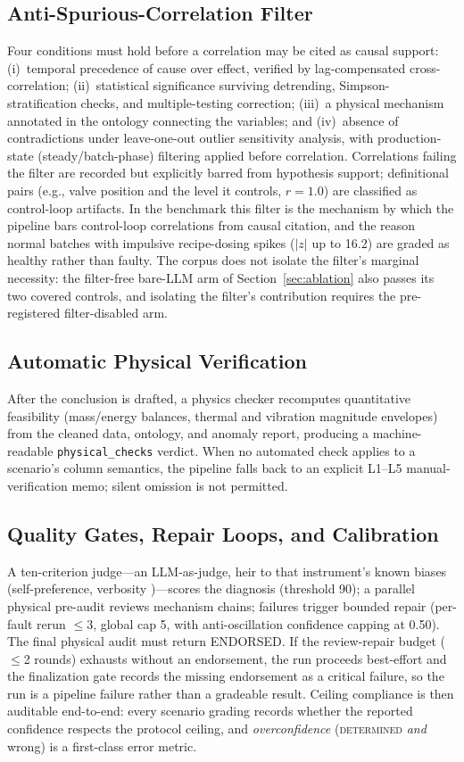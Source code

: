 \documentclass[preprint,12pt]{elsarticle}
\begin{document}
\subsection{Anti-Spurious-Correlation Filter}
Four conditions must hold before a correlation may be cited as causal support: (i)~temporal precedence of cause over effect, verified by lag-compensated cross-correlation; (ii)~statistical significance surviving detrending, Simpson-stratification checks, and multiple-testing correction; (iii)~a physical mechanism annotated in the ontology connecting the variables; and (iv)~absence of contradictions under leave-one-out outlier sensitivity analysis, with production-state (steady/batch-phase) filtering applied before correlation. Correlations failing the filter are recorded but explicitly barred from hypothesis support; definitional pairs (e.g., valve position and the level it controls, $r\!=\!1.0$) are classified as control-loop artifacts. In the benchmark this filter is the mechanism by which the pipeline bars control-loop correlations from causal citation, and the reason normal batches with impulsive recipe-dosing spikes ($|z|$ up to 16.2) are graded as healthy rather than faulty. The corpus does not isolate the filter's marginal necessity: the filter-free bare-LLM arm of Section~\ref{sec:ablation} also passes its two covered controls, and isolating the filter's contribution requires the pre-registered filter-disabled arm.

\subsection{Automatic Physical Verification}
After the conclusion is drafted, a physics checker recomputes quantitative feasibility (mass/energy balances, thermal and vibration magnitude envelopes) from the cleaned data, ontology, and anomaly report, producing a machine-readable \texttt{physical\_checks} verdict. When no automated check applies to a scenario's column semantics, the pipeline falls back to an explicit L1--L5 manual-verification memo; silent omission is not permitted.

\subsection{Quality Gates, Repair Loops, and Calibration}
A ten-criterion judge---an LLM-as-judge, heir to that instrument's known biases (self-preference, verbosity \cite{zheng2023judging,panickssery2024selfpref})---scores the diagnosis (threshold 90); a parallel physical pre-audit reviews mechanism chains; failures trigger bounded repair (per-fault rerun $\le$3, global cap 5, with anti-oscillation confidence capping at 0.50). The final physical audit must return ENDORSED. If the review-repair budget ($\le$2 rounds) exhausts without an endorsement, the run proceeds best-effort and the finalization gate records the missing endorsement as a critical failure, so the run is a pipeline failure rather than a gradeable result. Ceiling compliance is then auditable end-to-end: every scenario grading records whether the reported confidence respects the protocol ceiling, and \emph{overconfidence} (\mbox{\textsc{determined}} \emph{and} wrong) is a first-class error metric.
\end{document}

